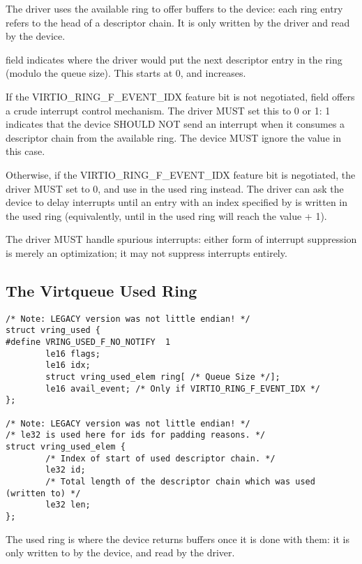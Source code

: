 The driver uses the available ring to offer buffers to the
device: each ring entry refers to the head of a descriptor chain.  It is only
written by the driver and read by the device.

 field indicates where the driver would put the next descriptor
entry in the ring (modulo the queue size). This starts at 0, and increases.

If the VIRTIO_RING_F_EVENT_IDX feature bit is not negotiated,
 field offers a crude interrupt control mechanism.  The driver
MUST set this to 0 or 1: 1 indicates that the device SHOULD NOT send
an interrupt when it consumes a descriptor chain from the available
ring.  The device MUST ignore the  value in this case.

Otherwise, if the VIRTIO_RING_F_EVENT_IDX feature bit is negotiated,
the driver MUST set  to 0, and use 
in the used ring instead.  The driver can ask the device to delay interrupts
until an entry with an index specified by  is
written in the used ring (equivalently, until  in the
used ring will reach the value  + 1).

The driver MUST handle spurious interrupts: either form of interrupt
suppression is merely an optimization; it may not suppress interrupts
entirely.

\subsection{The Virtqueue Used Ring}\label{sec:Basic Facilities of a Virtio Device / Virtqueues / The Virtqueue Used Ring}

\begin{lstlisting}
/* Note: LEGACY version was not little endian! */
struct vring_used {
#define VRING_USED_F_NO_NOTIFY  1
        le16 flags;
        le16 idx;
        struct vring_used_elem ring[ /* Queue Size */];
        le16 avail_event; /* Only if VIRTIO_RING_F_EVENT_IDX */
};

/* Note: LEGACY version was not little endian! */
/* le32 is used here for ids for padding reasons. */
struct vring_used_elem {
        /* Index of start of used descriptor chain. */
        le32 id;
        /* Total length of the descriptor chain which was used (written to) */
        le32 len;
};
\end{lstlisting}

The used ring is where the device returns buffers once it is done with
them: it is only written to by the device, and read by the driver.

